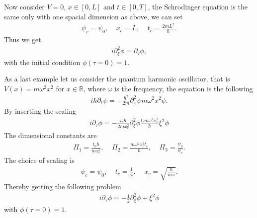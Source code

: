 \documentclass[a4paper]{article}
\begin{document}
Now consider $V = 0$, $x\in[0, L]$ and $t \in [0, T]$, the Schrodinger
equation is the same only with one spacial dimension as above, we can set
\begin{align}
    \psi_c = \psi_0, \;\;\;\; x_c =L, \;\;\;\; t_c = \frac{2mL^2}{\hbar}.
\end{align}
Thus we get
\begin{align}
    i\partial_{\xi}^2 \phi = \partial_\tau \phi,
\end{align}
with the initial condition $\phi(\tau=0) = 1$.

As a last example let us consider the quantum harmonic oscillator, that is
$V(x) = m\omega^2 x^2$ for $x\in \mathbb{R}$, where $\omega$ is the
frequency, the equation is the following
\begin{align}
    i \hbar \partial_t \psi = -\frac{\hbar^2}{2m}\partial^2_x \psi
    m\omega^2x^2 \psi.
\end{align}
By inserting the scaling
\begin{align}
    i\partial_\tau \phi = -\frac{t_c\hbar}{2mx_c^2}\partial_\xi^2 \phi
    \frac{t_cm\omega^2x_c^2}{\hbar} \xi^2 \phi
\end{align}
The dimensional constants are
\begin{align}
    \Pi_1 = \frac{t_0\hbar}{mx_c^2},\;\;\;\;\Pi_2 =
    \frac{m\omega^2x_c^2t_c}{\hbar},\;\;\;\; \Pi_3 = \frac{\psi_0}{\psi_c}.
\end{align}
The choice of scaling is
\begin{align}
    \psi_c = \psi_0, \;\;\;\; t_c = \frac{1}{\omega}, \;\;\;\; x_c =
    \sqrt{\frac{\hbar}{m\omega}}.
\end{align}
Thereby getting the following problem
\begin{align}
    i\partial_\tau \phi = -\frac{1}{2} \partial_\xi^2 \phi +\xi^2 \phi
\end{align}
with $\phi(\tau = 0) = 1$.



\end{document}
